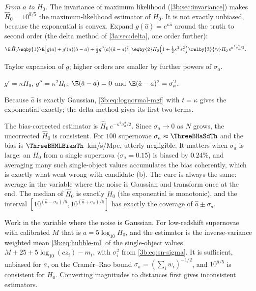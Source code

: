 \emph{From $a$ to $H_0$.} The invariance of maximum likelihood
(\cref{3b:sec:invariance}) makes $\hat H_0=10^{\hat a/5}$ the maximum-likelihood
estimator of $H_0$. It is not exactly unbiased, because the exponential is
convex. Expand $g(\hat a)=e^{\kappa\hat a}$ around the truth to second order
(the delta method of \cref{3a:sec:delta}, one order further):
\begin{align}
  \E\,\hat H_0
  &\eqby{1}\E\Bigl[g(a)+g'(a)(\hat a-a)+\tfrac12g''(a)(\hat a-a)^2\Bigr]
   \eqby{2}H_0\Bigl(1+\tfrac12\kappa^2\sigma_a^2\Bigr)
   \relby{3}{\approx}H_0\,e^{\kappa^2\sigma_a^2/2}.
  \label{3b:eq:hubble-delta}
\end{align}
\begin{explain}
  \item Taylor expansion of $g$; higher orders are smaller by further powers of $\sigma_a$.
  \item $g'=\kappa H_0$, $g''=\kappa^2H_0$; $\E(\hat a-a)=0$ and $\E(\hat a-a)^2=\sigma_a^2$.
  \item Because $\hat a$ is exactly Gaussian, \eqref{3b:eq:lognormal-mgf} with
        $t=\kappa$ gives the exponential exactly; the delta method gives its
        first two terms.
\end{explain}
The bias-corrected estimator is $\hat H_0\,e^{-\kappa^2\sigma_a^2/2}$. Since
$\sigma_a\to0$ as $N$ grows, the uncorrected $\hat H_0$ is consistent. For
$100$ supernovae $\sigma_a\approx\ThreeBHaSdTh$ and the bias is
$\ThreeBHMLBiasTh$~km/s/Mpc, utterly negligible. It matters when $\sigma_a$
is large: an $H_0$ from a single supernova ($\sigma_a=0.15$) is biased by
$0.24\%$, and averaging many such single-object values accumulates the
bias coherently, which is exactly what went wrong with candidate (b). The
cure is always the same: average in the variable where the noise is
Gaussian and transform once at the end. The median of $\hat H_0$ is exactly
$H_0$ (the exponential is monotonic), and the interval
$[10^{(\hat a-\sigma_a)/5},10^{(\hat a+\sigma_a)/5}]$ has exactly the coverage of
$\hat a\pm\sigma_a$.

\begin{keyidea}
Work in the variable where the noise is Gaussian. For low-redshift
supernovae with calibrated $M$ that is $a=5\log_{10}H_0$, and the
estimator is the inverse-variance weighted mean
\eqref{3b:eq:hubble-ml} of the single-object values
$M+25+5\log_{10}(cz_i)-m_i$, with $\sigma_i^2$ from \eqref{3b:eq:sn-sigma}.
It is sufficient, unbiased for $a$, on the Cram\'er--Rao bound $\sigma_a=(\sum_iw_i)^{-1/2}$,
and $10^{\hat a/5}$ is consistent for $H_0$. Converting magnitudes to
distances first gives inconsistent estimators.
\end{keyidea}

